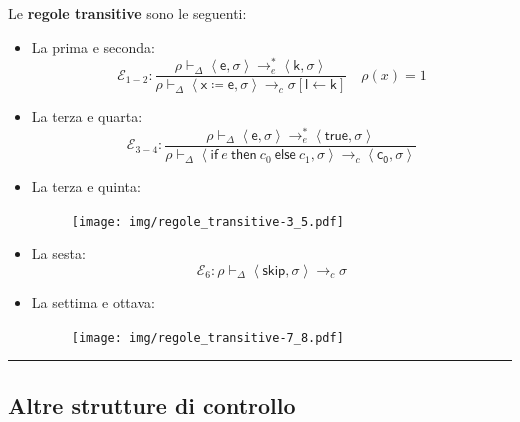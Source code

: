 \documentclass[a4paper]{article}
\newcommand{\longline}{\noindent\rule{\textwidth}{0.4pt}}
\begin{document}
 	Le \textcolor{Red3}{\textbf{regole transitive}} sono le seguenti:
 	\begin{itemize}
 		\item La prima e seconda:
 		\begin{equation*}
 			\mathcal{E}_{1-2} : \dfrac{\rho \vdash_{\Delta} \left\langle \mathsf{e}, \mathsf{\sigma} \right\rangle \longrightarrow^{*}_{e} \left\langle \mathsf{k}, \mathsf{\sigma} \right\rangle  }{\rho \vdash_{\Delta} \left\langle \mathsf{x} \coloneq \mathsf{e}, \mathsf{\sigma} \right\rangle \longrightarrow_{c} \sigma\left[\mathsf{l} \leftarrow \mathsf{k}\right]} \hspace{1em} \rho\left(x\right) = 1
 		\end{equation*}
 		
 		\item La terza e quarta:
 		\begin{equation*}
 			\mathcal{E}_{3-4} : \dfrac
 			{\rho \vdash_{\Delta} \left\langle \mathsf{e}, \mathsf{\sigma} \right\rangle \longrightarrow^{*}_{e} \left\langle \mathsf{true}, \mathsf{\sigma} \right\rangle}
 			{\rho \vdash_{\Delta} \left\langle \mathsf{if} \: e \: \mathsf{then} \: c_{0} \: \mathsf{else} \: c_{1}, \sigma \right\rangle \longrightarrow_{c} \left\langle \mathsf{c_{0}}, \mathsf{\sigma} \right\rangle}
 		\end{equation*}
 		
 		\item La terza e quinta:
 		\begin{figure}[!htp]
 			\centering
 			\texttt{[image: img/regole\_transitive-3\_5.pdf]}
 		\end{figure}
 		
 		\item La sesta:
 		\begin{equation*}
 			\mathcal{E}_{6}: \rho \vdash_{\Delta} \left\langle \mathsf{skip}, \mathsf{\sigma} \right\rangle \longrightarrow_{c} \sigma
 		\end{equation*}\newpage
 		
 		\item La settima e ottava:
 		\begin{figure}[!htp]
 			\centering
 			\texttt{[image: img/regole\_transitive-7\_8.pdf]}
 		\end{figure}
 	\end{itemize}
 	
 	\longline
 	
 	\subsection{Altre strutture di controllo}
 	
\end{document}
